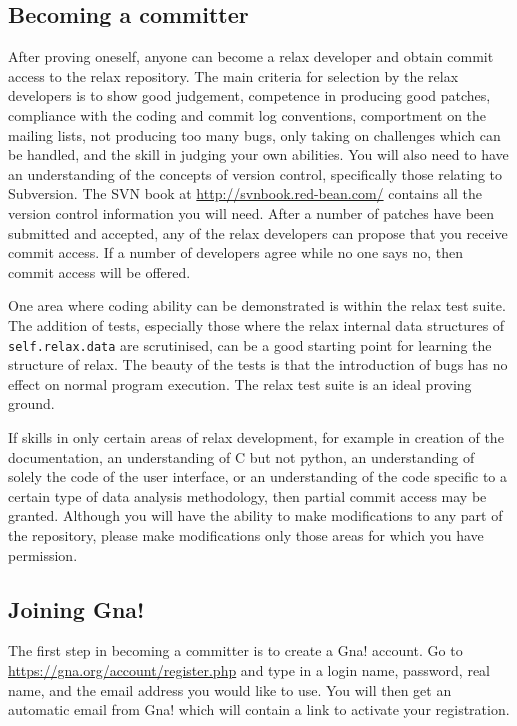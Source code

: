 \subsection{Becoming a committer}\label{becoming a committer}

After proving oneself, anyone can become a relax developer and obtain commit access to the relax repository.  The main criteria for selection by the relax developers is to show good judgement, competence in producing good patches, compliance with the coding and commit log conventions, comportment on the mailing lists, not producing too many bugs, only taking on challenges which can be handled, and the skill in judging your own abilities.  You will also need to have an understanding of the concepts of version control, specifically those relating to Subversion.  The SVN book at \href{http://svnbook.red-bean.com/}{http://svnbook.red-bean.com/} contains all the version control information you will need.  After a number of patches have been submitted and accepted, any of the relax developers can propose that you receive commit access.  If a number of developers agree while no one says no, then commit access will be offered.

One area where coding ability can be demonstrated is within the relax test suite.  The addition of tests, especially those where the relax internal data structures of \texttt{self.relax.data} are scrutinised, can be a good starting point for learning the structure of relax.  The beauty of the tests is that the introduction of bugs has no effect on normal program execution.  The relax test suite is an ideal proving ground.

If skills in only certain areas of relax development, for example in creation of the documentation, an understanding of C but not python, an understanding of solely the code of the user interface, or an understanding of the code specific to a certain type of data analysis methodology, then partial commit access may be granted.  Although you will have the ability to make modifications to any part of the repository, please make modifications only those areas for which you have permission.


\subsection{Joining Gna!}

The first step in becoming a committer is to create a Gna! account.  Go to \href{https://gna.org/account/register.php}{https://gna.org/account/register.php} and type in a login name, password, real name, and the email address you would like to use.  You will then get an automatic email from Gna! which will contain a link to activate your registration.



